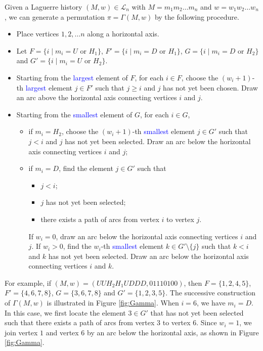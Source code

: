 \documentclass[12pt]{article}
\def\blue{\textcolor{blue}}
\def\blue{\textcolor{blue}}
\numberwithin{equation}{section}
\def\blue{\textcolor{blue}}
\def\blue{\textcolor{blue}}
\theoremstyle{plain}
\def\L{\mathcal{L}}
\begin{document}
    	
    	
    	Given a Laguerre history $(M,w)\in\L_{n}$ with $M=m_1m_2\ldots m_n$ and $w=w_1w_2\ldots w_n$, we can generate a permutation $\pi=\Gamma(M,w)$ by the following procedure. 
    	 \begin{itemize}
    	 	\item[Step 1.] Place vertices $1,2,\ldots n$ along a horizontal axis. 
    	 	\item[Step 2.] Let $F=\{i\mid m_i=U\,\, \mbox{or}\,\, H_1\}$, $F'=\{i\mid m_i=D \,\, \mbox{or}\,\, H_1\}$, $G=\{i\mid m_i=D\,\, \mbox{or}\,\, H_2\}$ and $G'=\{i\mid m_i=U\,\, \mbox{or}\,\, H_2\}$. 
    	 	\item[Step 3.] Starting from the   \blue{largest} element of $F$, for each $i\in F$,  
    	 	choose the $(w_i+1)$-th \blue{largest} element $j\in F'$ such that $j\geq i$ and $j$ has not yet been chosen. 
    	 	Draw an arc above the horizontal axis connecting vertices $i$ and $j$.
    	 	
    	 	\item[Step 4.] Starting from the \blue{smallest} element of $G$, for each $i\in G$,
    	 	\begin{itemize}
    	 		\item if $m_i=H_2$, choose the $(w_i+1)$-th \blue{smallest} element $j\in G'$ such that $j<i$ and $j$ has not yet been selected. Draw an arc below the horizontal axis connecting vertices $i$ and $j$;
    	 		\item if $m_i = D$, find the element $j\in G'$  such that  
    	 		\begin{itemize}
    	 			\item $j<i$;
    	 			\item 	$j$ has not yet been selected;
    	 			\item  there exists a path of arcs from vertex $i$ to vertex $j$.
    	 			\end{itemize}
    	 		If $w_i=0$, draw an arc below the horizontal axis connecting vertices $i$ and $j$. If $w_i>0$, find the $w_i$-th \blue{smallest} element $k\in G'\setminus\{j\}$ such that $k<i$ and $k$ has not yet been selected. Draw an arc below the horizontal axis connecting vertices $i$ and $k$.
    	 	\end{itemize}
    	 	
    	 	
    	 	
    	 \end{itemize}
    	 
    	 For example, if $(M,w)=(UUH_2H_1UDDD, 01110100)$, then
    	 $F=\{1,2,4,5\}$, $F'=\{4,6,7,8\}$, $G=\{3,6,7,8\}$ and $G'=\{1,2,3,5\}$. The successive construction of $\Gamma(M,w)$ is illustrated in Figure \ref{fig:Gamma}. When $i=6$, we have $m_i=D$. In this case, we first locate the element  $3\in G'$ that has not yet been selected such that there exists a path of arcs from vertex $3$ to vertex $6$.  Since $w_i=1$, we join vertex $1$ and vertex $6$ by an arc below the horizontal axis, as shown in Figure \ref{fig:Gamma}.
    	 
\end{document}
